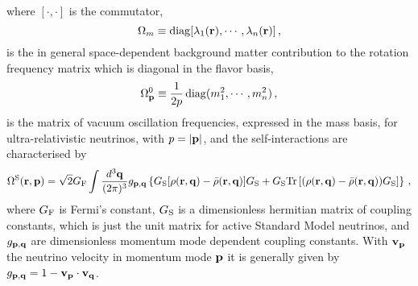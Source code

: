 \documentclass[prd,aps]{revtex4-2}
\begin{document}
where $[{\cdot},{\cdot}]$ is the commutator,
\begin{equation}\label{eq:Omega_m}
\Omega_m\equiv{\rm diag}[\lambda_1({\bf r}),\cdots,\lambda_n({\bf r})]\,,
\end{equation}
is the in general space-dependent background
matter contribution to the rotation frequency matrix which is diagonal in the flavor basis,
\begin{equation}\label{eq:Omega_p}
\Omega^0_{\bf p}\equiv\frac{1}{2p}\,{\rm diag}(m_1^2,\cdots,m_n^2)\,,
\end{equation}
is the matrix of vacuum oscillation frequencies, expressed in the mass basis, for
ultra-relativistic neutrinos, with $p=|{\bf p}|$, and the self-interactions are characterised by
\begin{equation}
\Omega^{\rm S}({\bf r},{\bf p})=\sqrt2 G_{\rm F}\int \frac{d^3{\bf q}}{(2\pi)^3}g_{{\bf p},{\bf q}}\left\{
    G_{\rm S}[\rho({\bf r},{\bf q})-\bar\rho({\bf r},{\bf q})]G_{\rm S}+G_{\rm S}
    {\rm Tr}\left[(\rho({\bf r},{\bf q})-\bar\rho({\bf r},{\bf q}))G_{\rm S}\right]\right\}\,,\label{eq:Onu}
\end{equation}
where $G_{\rm F}$ is Fermi's constant, $G_{\rm S}$ is a dimensionless hermitian matrix of coupling constants, which is
just the unit matrix for active Standard Model neutrinos, and $g_{{\bf p},{\bf q}}$
are dimensionless momentum mode dependent coupling constants. With ${\bf v}_{\bf p}$ the neutrino velocity in momentum
mode ${\bf p}$ it is generally given by $g_{{\bf p},{\bf q}}=1-{\bf v}_{\bf p}\cdot{\bf v}_{\bf q}$.
\end{document}
